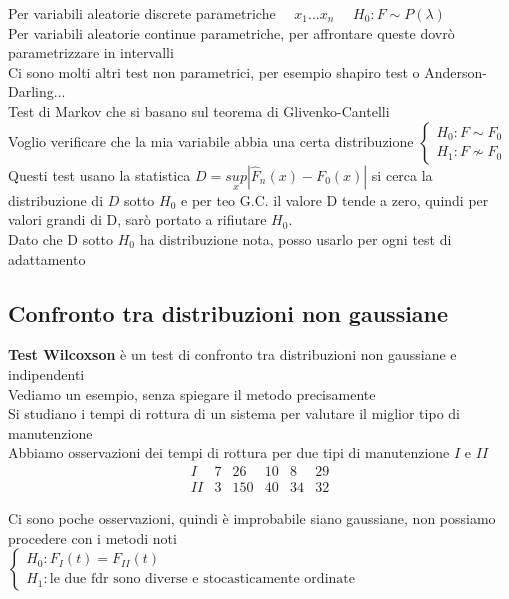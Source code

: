 Per variabili aleatorie discrete parametriche \ \ $x_1 ... x_n$ \ \ $H_0 : F\sim P(\lambda)$\\
Per variabili aleatorie continue parametriche, per affrontare queste dovrò parametrizzare in intervalli\\

Ci sono molti altri test non parametrici, per esempio shapiro test o Anderson-Darling...\\

Test di Markov che si basano sul teorema di Glivenko-Cantelli\\
Voglio verificare che la mia variabile abbia una certa distribuzione $\begin{cases} H_0: F\sim F_0\\
H_1: F \not\sim F_0 \end{cases}$\\
Questi test usano la statistica $D=\underset{x}{sup} |\hat{F}_n(x)-F_0(x)|$ si cerca la distribuzione di $D$ sotto $H_0$ e per teo G.C. il valore D tende a zero, quindi per valori grandi di D, sarò portato a rifiutare $H_0$.\\
Dato che D sotto $H_0$ ha distribuzione nota, posso usarlo per ogni test di adattamento\\


\subsection{Confronto tra distribuzioni non gaussiane}

\textbf{Test Wilcoxson} è un test di confronto tra distribuzioni non gaussiane e indipendenti\\

Vediamo un esempio, senza spiegare il metodo precisamente\\
Si studiano i tempi di rottura di un sistema per valutare il miglior tipo di manutenzione\\
Abbiamo osservazioni dei tempi di rottura per due tipi  di manutenzione $I$ e $II$
\[
\begin{array}{c|c|c|c|c|c}
    I & 7 & 26 & 10 & 8 & 29  \\
    \hline
    II & 3 & 150 & 40 & 34 & 32
\end{array}
\]

Ci sono poche osservazioni, quindi è improbabile siano gaussiane, non possiamo procedere con i metodi noti\\
$\begin{cases}
    H_0 : F_I(t)=F_{II}(t)\\
    H_1 : \text{le due fdr sono diverse e stocasticamente ordinate}
\end{cases}$\\

